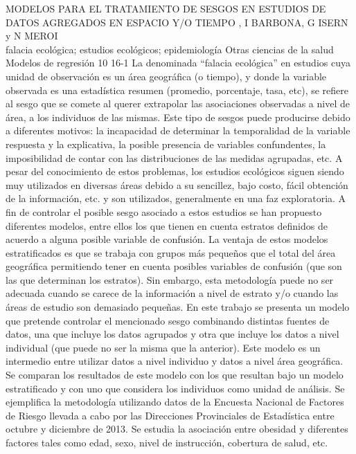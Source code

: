 \A
{MODELOS PARA EL TRATAMIENTO DE SESGOS EN ESTUDIOS DE DATOS AGREGADOS EN ESPACIO Y/O TIEMPO}
{, I BARBONA, G ISERN y N MEROI}
{
\\}
{falacia ecológica; estudios ecológicos; epidemiología} 
 {Otras ciencias de la salud} 
 {Modelos de regresión} 
 {10} 
 {16-1}
{La denominada “falacia ecológica” en estudios cuya unidad de observación es un área geográfica (o tiempo), y donde la variable observada es una estadística resumen (promedio, porcentaje, tasa, etc), se refiere al sesgo que se comete al querer extrapolar las asociaciones observadas a nivel de área, a los individuos de las mismas. Este tipo de sesgos puede producirse debido a diferentes motivos: la incapacidad de determinar la temporalidad de la variable respuesta y la explicativa, la posible presencia de variables confundentes, la imposibilidad de contar con las distribuciones de las medidas agrupadas, etc. A pesar del conocimiento de estos problemas, los estudios ecológicos siguen siendo muy utilizados en diversas áreas debido a su sencillez, bajo costo, fácil obtención de la información, etc. y son utilizados, generalmente en una faz exploratoria. A fin de controlar el posible sesgo asociado a estos estudios se han propuesto diferentes modelos, entre ellos los que tienen en cuenta estratos definidos de acuerdo a alguna posible variable de confusión. La ventaja de estos modelos estratificados es que se trabaja con grupos más pequeños que el total del área geográfica permitiendo tener en cuenta posibles variables de confusión (que son las que determinan los estratos). Sin embargo, esta metodología puede no ser adecuada cuando se carece de la información a nivel de estrato y/o cuando las áreas de estudio son demasiado pequeñas. En este trabajo se presenta un modelo que pretende controlar el mencionado sesgo combinando distintas fuentes de datos, una que incluye los datos agrupados y otra que incluye los datos a nivel individual (que puede no ser la misma que la anterior). Este modelo es un intermedio entre utilizar datos a nivel individuo y datos a nivel área geográfica. Se comparan los resultados de este modelo con los que resultan bajo un modelo estratificado y con uno que considera los individuos como unidad de análisis. Se ejemplifica la metodología utilizando datos de la Encuesta Nacional de Factores de Riesgo llevada a cabo por las Direcciones Provinciales de Estadística entre octubre y diciembre de 2013. Se estudia la asociación entre obesidad y diferentes factores tales como edad, sexo, nivel de instrucción, cobertura de salud, etc. }
